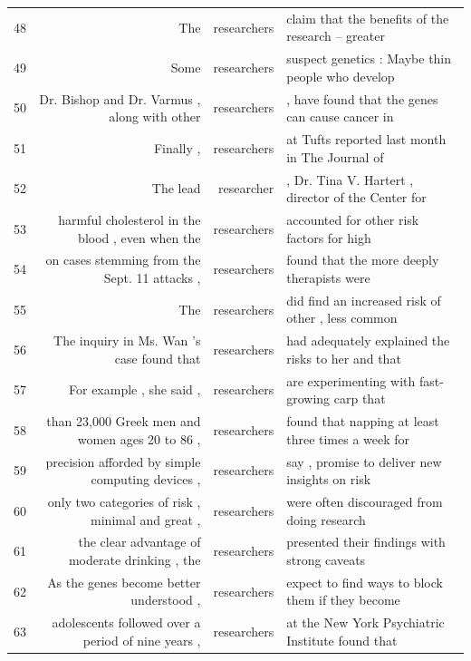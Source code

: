 {\begin{table}
\begin{tabular}{lrrl}
48 & The                                                & researchers & claim that the benefits of the research -- greater \\
49 & Some                                               & researchers & suspect genetics : Maybe thin people who develop   \\
50 & Dr. Bishop and Dr. Varmus , along with other       & researchers & , have found that the genes can cause cancer in    \\
51 & Finally ,                                          & researchers & at Tufts reported last month in The Journal of     \\
52 & The lead                                           & researcher  & , Dr. Tina V. Hartert , director of the Center for \\
53 & harmful cholesterol in the blood , even when the   & researchers & accounted for other risk factors for high          \\
54 & on cases stemming from the Sept. 11 attacks ,      & researchers & found that the more deeply therapists were         \\
55 & The                                                & researchers & did find an increased risk of other , less common  \\
56 & The inquiry in Ms. Wan 's case found that          & researchers & had adequately explained the risks to her and that \\
57 & For example , she said ,                           & researchers & are experimenting with fast-growing carp that      \\
58 & than 23,000 Greek men and women ages 20 to 86 ,    & researchers & found that napping at least three times a week for \\
59 & precision afforded by simple computing devices ,   & researchers & say , promise to deliver new insights on risk      \\
60 & only two categories of risk , minimal and great ,  & researchers & were often discouraged from doing research         \\
61 & the clear advantage of moderate drinking , the     & researchers & presented their findings with strong caveats       \\
62 & As the genes become better understood ,            & researchers & expect to find ways to block them if they become   \\
63 & adolescents followed over a period of nine years , & researchers & at the New York Psychiatric Institute found that   \\

\end{tabular}
\end{table}}
